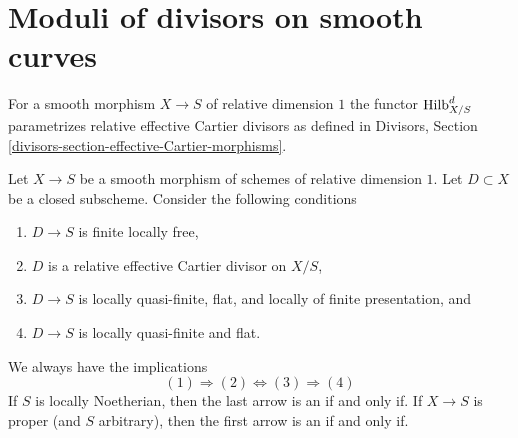\section{Moduli of divisors on smooth curves}
\label{section-divisors}

\noindent
For a smooth morphism $X \to S$ of relative dimension $1$ the functor
$\mathrm{Hilb}^d_{X/S}$ parametrizes relative effective Cartier divisors
as defined in
Divisors, Section \ref{divisors-section-effective-Cartier-morphisms}.

\begin{lemma}
\label{lemma-divisors-on-curves}
Let $X \to S$ be a smooth morphism of schemes of relative dimension $1$.
Let $D \subset X$ be a closed subscheme. Consider the following conditions
\begin{enumerate}
\item $D \to S$ is finite locally free,
\item $D$ is a relative effective Cartier divisor on $X/S$,
\item $D \to S$ is locally quasi-finite, flat, and
locally of finite presentation, and
\item $D \to S$ is locally quasi-finite and flat.
\end{enumerate}
We always have the implications
$$
(1) \Rightarrow (2) \Leftrightarrow (3) \Rightarrow (4)
$$
If $S$ is locally Noetherian, then the last arrow is an if and only if.
If $X \to S$ is proper (and $S$ arbitrary), then the first arrow is
an if and only if.
\end{lemma}

